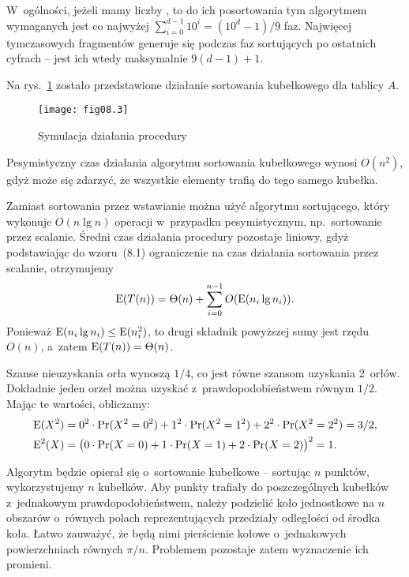 W~ogólności, jeżeli mamy liczby , to do ich posortowania tym algorytmem wymaganych jest co najwyżej $\sum_{i=0}^{d-1}10^i=(10^d-1)/9$ faz. Najwięcej tymczasowych fragmentów generuje się podczas faz sortujących po ostatnich cyfrach -- jest ich wtedy maksymalnie $9(d-1)+1$.


\exercise %
Na rys.~\ref{fig:8.4-1} zostało przedstawione działanie sortowania kubełkowego dla tablicy $A$.
\begin{figure}[ht]
	\begin{center}
		\texttt{[image: fig08.3]}
	\end{center}
	\caption{Symulacja działania procedury } \label{fig:8.4-1}
\end{figure}

\exercise %
Pesymistyczny czas działania algorytmu sortowania kubełkowego wynosi $O(n^2)$, gdyż może się zdarzyć, że wszystkie elementy trafią do tego samego kubełka.

Zamiast sortowania przez wstawianie można użyć algorytmu sortującego, który wykonuje $O(n\lg n)$ operacji w~przypadku pesymistycznym, np.\ sortowanie przez scalanie. Średni czas działania procedury  pozostaje liniowy, gdyż podstawiając do wzoru~(8.1) ograniczenie na czas działania sortowania przez scalanie, otrzymujemy
\[
	\operatorname{E}(T(n)) = \Theta(n)+\sum_{i=0}^{n-1}O(\operatorname{E}(n_i\lg n_i)).
\]
Ponieważ $\operatorname{E}(n_i\lg n_i)\le\operatorname{E}(n_i^2)$, to drugi składnik powyższej sumy jest rzędu $O(n)$, a~zatem $\operatorname{E}(T(n))=\Theta(n)$.

\exercise %
Szanse nieuzyskania orła wynoszą $1/4$, co jest równe szansom uzyskania 2~orłów. Dokładnie jeden orzeł można uzyskać z~prawdopodobieństwem równym $1/2$. Mając te wartości, obliczamy:
\begin{align*}
	\operatorname{E}(X^2) &= 0^2\cdot\Pr(X^2=0^2)+1^2\cdot\Pr(X^2=1^2)+2^2\cdot\Pr(X^2=2^2) = 3/2, \\
	\operatorname{E}^2(X) &= \bigl(0\cdot\Pr(X=0)+1\cdot\Pr(X=1)+2\cdot\Pr(X=2)\bigr)^2 = 1.
\end{align*}

\exercise %
Algorytm będzie opierał się o~sortowanie kubełkowe -- sortując $n$ punktów, wykorzystujemy $n$ kubełków. Aby punkty trafiały do poszczególnych kubełków z~jednakowym prawdopodobieństwem, należy podzielić koło jednostkowe na $n$ obszarów o~równych polach reprezentujących przedziały odległości od środka koła. Łatwo zauważyć, że będą nimi pierścienie kołowe o~jednakowych powierzchniach równych $\pi/n$. Problemem pozostaje zatem wyznaczenie ich promieni.

